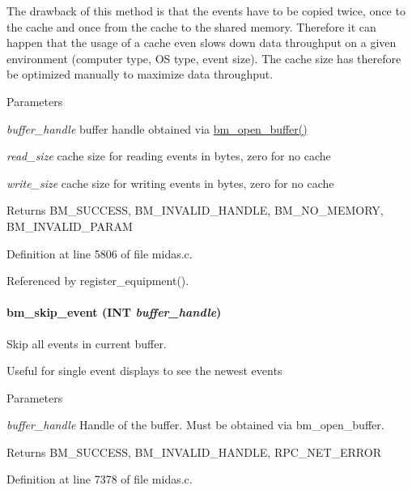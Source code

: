 The drawback of this method is that the events have to be copied twice, once to the cache and once from the cache to the shared memory. Therefore it can happen that the usage of a cache even slows down data throughput on a given environment (computer type, OS type, event size). The cache size has therefore be optimized manually to maximize data throughput. 
\begin{DoxyParams}{Parameters}
\item[{\em buffer\_\-handle}]buffer handle obtained via \hyperlink{group__bmfunctionc_gae9636ff3e34ee94e31cb292bd07a679d}{bm\_\-open\_\-buffer()} \item[{\em read\_\-size}]cache size for reading events in bytes, zero for no cache \item[{\em write\_\-size}]cache size for writing events in bytes, zero for no cache \end{DoxyParams}
\begin{DoxyReturn}{Returns}
BM\_\-SUCCESS, BM\_\-INVALID\_\-HANDLE, BM\_\-NO\_\-MEMORY, BM\_\-INVALID\_\-PARAM 
\end{DoxyReturn}


Definition at line 5806 of file midas.c.

Referenced by register\_\-equipment().
\paragraph[{bm\_\-skip\_\-event}]{ bm\_\-skip\_\-event ({\bf INT} {\em buffer\_\-handle})}\hfill\label{group__bmfunctionc_ga4a12567d843b2e1d20da58d8abfabb04}
Skip all events in current buffer.

Useful for single event displays to see the newest events 
\begin{DoxyParams}{Parameters}
\item[{\em buffer\_\-handle}]Handle of the buffer. Must be obtained via bm\_\-open\_\-buffer. \end{DoxyParams}
\begin{DoxyReturn}{Returns}
BM\_\-SUCCESS, BM\_\-INVALID\_\-HANDLE, RPC\_\-NET\_\-ERROR 
\end{DoxyReturn}


Definition at line 7378 of file midas.c.
